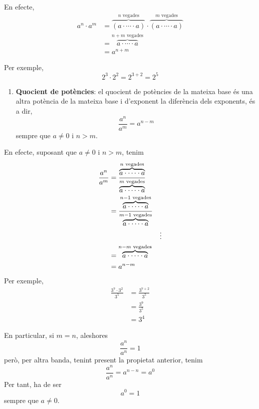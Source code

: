 En efecte, 
\begin{align*}
a^{n}\cdot a^{m} &=\overset{n\text{ vegades}}{\overbrace{\left( a\cdot \cdots
\cdot a\right) }}\cdot \overset{m\text{ vegades}}{\overbrace{\left( a\cdot
\cdots \cdot a\right) }} \\
&=\overset{n+m\text{ vegades}}{\overbrace{a\cdot \cdots \cdot a}} \\
&=a^{n+m}
\end{align*}

Per exemple,%
\begin{equation*}
2^{3}\cdot 2^{2}=2^{3+2}=2^{5}
\end{equation*}

\begin{enumerate}
\item[2.] \textbf{Quocient de potències}: el quocient de potències de la
mateixa base és una altra potència de la mateixa base i d’exponent la diferència dels
exponents, és a dir,%
\begin{equation*}
\frac{a^{n}}{a^{m}}=a^{n-m}
\end{equation*}%
sempre que $a\neq 0$ i $n>m$.
\end{enumerate}

En efecte, suposant que $a\neq 0$ i $n>m$, tenim%
\begin{align*}
\frac{a^{n}}{a^{m}} &=\frac{\overset{n\text{ vegades}}{\overbrace{a\cdot
\cdots \cdot a}}}{\overset{m\text{ vegades}}{\overbrace{a\cdot \cdots \cdot a}}%
} \\
&=\frac{\overset{n-1\text{ vegades}}{\overbrace{a\cdot \cdots \cdot a}}}{%
\overset{m-1\text{ vegades}}{\overbrace{a\cdot \cdots \cdot a}}} \\
&&\vdots \\
&=\overset{n-m\text{ vegades}}{\overbrace{a\cdot \cdots \cdot a}} \\
&=a^{n-m}
\end{align*}%
Per exemple,%
\begin{align*}
\frac{3^{7}\cdot 3^{2}}{3^{5}} &=\frac{3^{7+2}}{3^{5}} \\
&=\frac{3^{9}}{3^{5}} \\
&=3^{4}
\end{align*}

En particular, si $m=n$, aleshores%
\begin{equation*}
\frac{a^{n}}{a^{n}}=1
\end{equation*}%
però, per altra banda, tenint present la propietat anterior, tenim%
\begin{equation*}
\frac{a^{n}}{a^{n}}=a^{n-n}=a^{0}
\end{equation*}%
Per tant, ha de ser 
\begin{equation*}
a^{0}=1
\end{equation*}%
sempre que $a\neq 0$.

